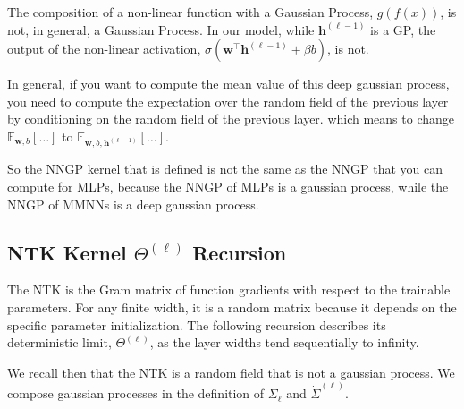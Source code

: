 \documentclass[a4paper]{article}
\begin{document}
\begin{itemize}
    The composition of a non-linear function with a Gaussian Process, $g(f(x))$, is not, in general, a Gaussian Process. In our model, while $\bm{h}^{(\ell-1)}$ is a GP, the output of the non-linear activation, $\sigma(\bm{w}^\top \bm{h}^{(\ell-1)} + \beta b)$, is not.
   
    In general, if you want to compute the mean value of this deep gaussian process, you need to compute the expectation over the random field of the previous layer by conditioning on the random field of the previous layer.
    which means to change $\mathbb{E}_{\bm{w}, b} \left[ \dots \right]$ to $\mathbb{E}_{\bm{w}, b, \bm{h}^{(\ell-1)}} \left[ \dots \right]$.

    So the NNGP kernel that is defined is not the same as the NNGP that you can compute for MLPs, because the NNGP of MLPs is a gaussian process, while the NNGP of MMNNs is a deep gaussian process.
\end{itemize}

\subsection{NTK Kernel \(\Theta^{(\ell)}\) Recursion}
The NTK is the Gram matrix of function gradients with respect to the trainable parameters. For any finite width, it is a random matrix because it depends on the specific parameter initialization. The following recursion describes its deterministic limit, $\Theta^{(\ell)}$, as the layer widths tend sequentially to infinity.

We recall then that the NTK is a random field that is not a gaussian process. 
We compose gaussian processes in the definition of $\Sigma_{\ell}$ and  $\dot{\Sigma}^{(\ell)}$.
\end{document}
